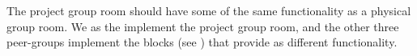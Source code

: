 The project group room should have some of the same functionality as a physical group room.
We as the \groupname{} implement the project group room, and the other three peer-groups implement the blocks (see ) that provide as different functionality.

\subsection{}


\subsection{}





